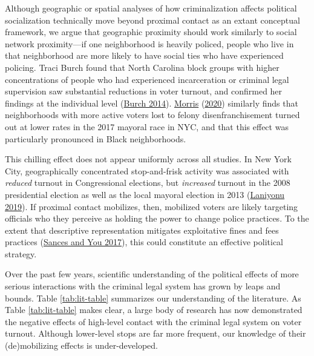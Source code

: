 \documentclass[
  12pt,
]{article}
\begin{document}
Although geographic or spatial analyses of how criminalization affects political socialization technically move beyond proximal contact as an extant conceptual framework, we argue that geographic proximity should work similarly to social network proximity---if one neighborhood is heavily policed, people who live in that neighborhood are more likely to have social ties who have experienced policing. Traci Burch found that North Carolina block groups with higher concentrations of people who had experienced incarceration or criminal legal supervision saw substantial reductions in voter turnout, and confirmed her findings at the individual level (\protect\hyperlink{ref-Burch2014}{Burch 2014}). \protect\hyperlink{ref-Morris2020}{Morris} (\protect\hyperlink{ref-Morris2020}{2020}) similarly finds that neighborhoods with more active voters lost to felony disenfranchisement turned out at lower rates in the 2017 mayoral race in NYC, and that this effect was particularly pronounced in Black neighborhoods.

This chilling effect does not appear uniformly across all studies. In New York City, geographically concentrated stop-and-frisk activity was associated with \emph{reduced} turnout in Congressional elections, but \emph{increased} turnout in the 2008 presidential election as well as the local mayoral election in 2013 (\protect\hyperlink{ref-Laniyonu2019}{Laniyonu 2019}). If proximal contact mobilizes, then, mobilized voters are likely targeting officials who they perceive as holding the power to change police practices. To the extent that descriptive representation mitigates exploitative fines and fees practices (\protect\hyperlink{ref-Sances2017}{Sances and You 2017}), this could constitute an effective political strategy.

Over the past few years, scientific understanding of the political effects of more serious interactions with the criminal legal system has grown by leaps and bounds. Table \ref{tab:lit-table} summarizes our understanding of the literature. As Table \ref{tab:lit-table} makes clear, a large body of research has now demonstrated the negative effects of high-level contact with the criminal legal system on voter turnout. Although lower-level stops are far more frequent, our knowledge of their (de)mobilizing effects is under-developed.

\begin{singlespace}

\end{singlespace}
\end{document}

